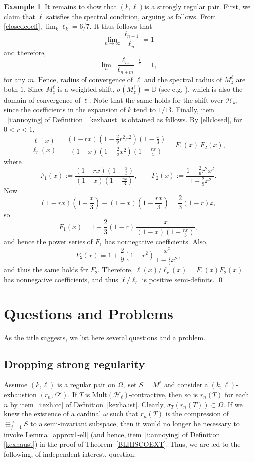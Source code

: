 \documentclass[a4paper,reqno,index]{amsart}
\numberwithin{equation}{section}
\newcommand{\specT}{\sigma_T}  %
\theoremstyle{definition}
\newtheorem{example}[theorem]{Example}
\begin{document}
\begin{example}
 
 It remains to show that $(k, \ell)$is a strongly regular pair.  First, we claim that $\ell$ satisfies the spectral condition, arguing as follows. From \eqref{closedcoeff},  $\lim_k \ell_k=6/7.$ 
It thus follows that
\[
 \lim_{n\to \infty} \frac{\ell_{n+1}}{\ell_n} =1
\]
 and therefore,
\[
 \lim_n \bigg| \frac{\ell_m}{\ell_{n+m}}
 \bigg|^{\frac{1}{n}} =1,
\]
for any $m.$ Hence, radius  of convergence of
 $\ell$ and the spectral radius of $M_z^\ell$ are both $1.$ Since $M_z^\ell$
 is a weighted shift, $\sigma(M_z^\ell) =\overline{\mathbb{D}}$ (see e.g. \cite[Proposition~15]{Shields}), which is
 also the domain of convergence of $\ell$. Note that the same holds for the shift over $\mathcal{H}_k,$ since the coefficients in the expansion of $k$ tend to $1/13.$ Finally, item ~\ref{i:annoying} of Definition ~\ref{kexhaust}  is obtained as follows. By \eqref{ellclosed},  for $0<r<1,$
\[
\frac{\ell(x)}{\ell_r(x)}
=
\frac{(1-rx)\left(1-\frac{2}{9} r^2 x^2\right)\left(1-\frac{x}{3}\right)}
{(1-x)\left(1-\frac{2}{9} x^2\right)\left(1-\frac{r x}{3}\right)}
=
F_1(x)\,F_2(x),
\]
where
\[
F_1(x):=\frac{(1-rx)\left(1-\frac{x}{3}\right)}{(1-x)\left(1-\frac{r x}{3}\right)},
\qquad
F_2(x):=\frac{1-\frac{2}{9} r^2 x^2}{1-\frac{2}{9} x^2}.
\]
Now
\[
(1-rx)\left(1-\frac{x}{3}\right)-(1-x)\left(1-\frac{r x}{3}\right)
=\frac{2}{3}(1-r)x,
\]
so
\[
F_1(x)
=
1+\frac{2}{3}(1-r)\,\frac{x}{(1-x)\left(1-\frac{r x}{3}\right)},
\]
and hence the power series of $F_1$ has nonnegative coefficients.
Also,
\[
F_2(x)
=
1+\frac{2}{9}(1-r^2)\,\frac{x^2}{1-\frac{2}{9} x^2},
\]
and thus the same holds for $F_2.$ Therefore, $\ell(x)/\ell_r(x)=F_1(x)F_2(x)$ has nonnegative   coefficients, and thus $\ell/\ell_r$
is positive semi-definite. 
\qed
 \end{example}



\section{Questions and Problems} \label{questions}

As the title suggests, we list here several questions and a problem.

\subsection{Dropping strong regularity} Assume $(k, \ell)$ is a regular pair on $\Omega,$ set $S=M^{\ell}_z$ and  consider  a $(k, \ell)$-exhaustion $(r_n, \Omega')$. If $T$ is $\text{Mult}(\mathcal{H}_{\ell})$-contractive, then so is $r_n(T)$
for each $n$ by item~\ref{i:exh:cc} of Definition~\ref{kexhaust}. Clearly, $\specT(r_n(T))\subset\Omega$. If we knew the existence of a cardinal $\omega$ such that $r_n(T)$ is the compression of 
 $\oplus_{j=1}^\omega S$ to a semi-invariant subspace, then it would no longer be  necessary to invoke Lemma~\ref{approx1-ell} (and hence, item~\ref{i:annoying} of Definition \ref{kexhaust})
in the proof of Theorem~\ref{BLHISCOEXT}. Thus, we are led to the following, of independent interest, question. 
\end{document}
